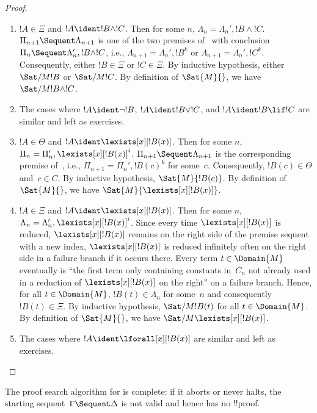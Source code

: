 \documentclass[../../../include/open-logic-section]{subfiles}
\begin{document}
\begin{proof}
\begin{enumerate}
  \item $!A \in \Xi$ and $!A \ident !B \land !C$. Then for some $n$,
  $\Lambda_n = \Lambda_n', !B \land !C$. $\Pi_{n+1} \Sequent
  \Lambda_{n+1}$ is one of the two premises of~\RightR{\land} with
  conclusion $\Pi_n \Sequent \Lambda'_n, !B \land !C$, i.e.,
  $\Lambda_{n+1} = \Lambda_n', !B^k$ or $\Lambda_{n+1} = \Lambda_n',
  !C^k$. Consequently, either $!B \in \Xi$ or $!C \in \Xi$. By
  inductive hypothesis, either $\Sat/{M}{!B}$ or $\Sat/{M}{!C}$. By
  definition of $\Sat{M}{}$, we have $\Sat/{M}{!B \land !C}$.
  
  \item The cases where $!A \ident \lnot !B$, $!A \ident !B \lor !C$,
  and $!A \ident !B \lif !C$ are similar and left as exercises.

  \item $!A \in \Theta$ and $!A \ident \lexists[x][!B(x)]$. Then for
  some $n$, $\Pi_n = \Pi_n', \lexists[x][!B(x)]^i$. $\Pi_{n+1}
  \Sequent \Lambda_{n+1}$ is the corresponding premise
  of~\LeftR{\lexists}, i.e., $\Pi_{n+1} = \Pi_n', !B(c)^k$ for
  some~$c$. Consequently, $!B(c) \in \Theta$ and~$c \in C$. By
  inductive hypothesis, $\Sat{M}{!B(c)}$. By definition of
  $\Sat{M}{}$, we have $\Sat{M}{\lexists[x][!B(x)]}$.

  \item $!A \in \Xi$ and $!A \ident \lexists[x][!B(x)]$. Then for some
  $n$, $\Lambda_n = \Lambda_n', \lexists[x][!B(x)]^i$. Since every time
  $\lexists[x][!B(x)]$ is reduced, $\lexists[x][!B(x)]$ remains on the
  right side of the premise sequent with a new index,
  $\lexists[x][!B(x)]$ is reduced infinitely often on the right side
  in a failure branch if it occurs there. Every term $t \in
  \Domain{M}$ eventually is ``the first term only containing constants
  in~$C_n$ not already used in a reduction of $\lexists[x][!B(x)]$ on
  the right'' on a failure branch. Hence, for all $t \in \Domain{M}$,
  $!B(t) \in \Lambda_n$ for some~$n$ and consequently $!B(t) \in \Xi$.
  By inductive hypothesis, $\Sat/{M}{!B(t)}$ for all $t \in
  \Domain{M}$. By definition of $\Sat{M}{}$, we have
  $\Sat/{M}{\lexists[x][!B(x)]}$.

  \item The cases where $!A \ident \lforall[x][!B(x)]$ are similar and
  left as exercises.
\end{enumerate}
\end{proof}

\begin{cor} The proof search algorithm for
 is complete: if it aborts or never halts, the starting
sequent~$\Gamma \Sequent \Delta$ is not valid and hence has no
!!{proof}.
\end{cor}
\end{document}
